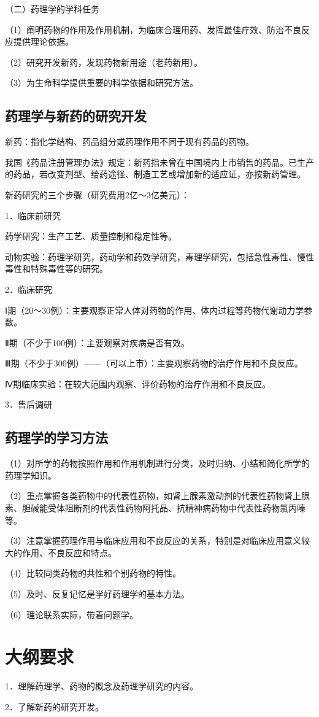 （二）药理学的学科任务

（1）阐明药物的作用及作用机制，为临床合理用药、发挥最佳疗效、防治不良反应提供理论依据。

（2）研究开发新药，发现药物新用途（老药新用）。

（3）为生命科学提供重要的科学依据和研究方法。

\subsection{药理学与新药的研究开发}

新药：指化学结构、药品组分或药理作用不同于现有药品的药物。

我国《药品注册管理办法》规定：新药指未曾在中国境内上市销售的药品。已生产的药品，若改变剂型、给药途径、制造工艺或增加新的适应证，亦按新药管理。

新药研究的三个步骤（研究费用2亿～3亿美元）：

1．临床前研究

药学研究：生产工艺、质量控制和稳定性等。

动物实验：药理学研究，药动学和药效学研究，毒理学研究，包括急性毒性、慢性毒性和特殊毒性等的研究。

2．临床研究

Ⅰ期（20～30例）：主要观察正常人体对药物的作用、体内过程等药物代谢动力学参数。

Ⅱ期（不少于100例）：主要观察对疾病是否有效。

Ⅲ期（不少于300例）------（可以上市）：主要观察药物的治疗作用和不良反应。

Ⅳ期临床实验：在较大范围内观察、评价药物的治疗作用和不良反应。

3．售后调研

\subsection{药理学的学习方法}

（1）对所学的药物按照作用和作用机制进行分类，及时归纳、小结和简化所学的药理学知识。

（2）重点掌握各类药物中的代表性药物，如肾上腺素激动剂的代表性药物肾上腺素、胆碱能受体阻断剂的代表性药物阿托品、抗精神病药物中代表性药物氯丙嗪等。

（3）注意掌握药理作用与临床应用和不良反应的关系，特别是对临床应用意义较大的作用、不良反应和特点。

（4）比较同类药物的共性和个别药物的特性。

（5）及时、反复记忆是学好药理学的基本方法。

（6）理论联系实际，带着问题学。

\section*{大纲要求}

1．理解药理学、药物的概念及药理学研究的内容。

2．了解新药的研究开发。


